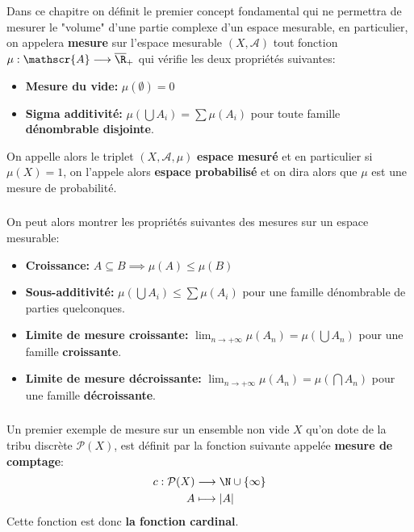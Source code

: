 \chapter*{} %

Dans ce chapitre on définit le premier concept fondamental qui ne permettra de mesurer le "volume" d'une partie complexe d'un espace mesurable, en particulier, on appelera \textbf{mesure} sur l'espace mesurable \((X, \mathscr{A})\) tout fonction \(\mu : \mathscr{A} \longrightarrow \overline{\R}_+\) qui vérifie les deux propriétés suivantes:
\begin{itemize}
   \item \textbf{Mesure du vide:} \(\mu(\emptyset) = 0\)
   \item \textbf{Sigma additivité:} \(\mu\left(\bigcup A_i\right) = \sum \mu\left(A_i\right)\) pour toute famille \textbf{dénombrable disjointe}. 
\end{itemize}
On appelle alors le triplet \((X, \mathscr{A}, \mu)\) \textbf{espace mesuré} et en particulier si \(\mu(X) = 1\), on l'appele alors \textbf{espace probabilisé} et on dira alors que \(\mu\) est une mesure de probabilité.
\subsection*{}
On peut alors montrer les propriétés suivantes des mesures sur un espace mesurable:
\begin{itemize}
   \item \textbf{Croissance:} \(A \subseteq B \implies \mu(A) \leq \mu(B)\)
   \item \textbf{Sous-additivité:} \(\mu\left(\bigcup A_i\right)\leq \sum \mu\left(A_i\right)\) pour une famille dénombrable de parties quelconques.
   \item \textbf{Limite de mesure croissante:} \(\lim_{n \rightarrow +\infty} \mu(A_n) = \mu\left(\bigcup A_n\right)\) pour une famille \textbf{croissante}.
   \item \textbf{Limite de mesure décroissante:} \(\lim_{n \rightarrow +\infty} \mu(A_n) = \mu\left(\bigcap A_n\right)\) pour une famille \textbf{décroissante}.
\end{itemize}

\subsection*{}
Un premier exemple de mesure sur un ensemble non vide \(X\) qu'on dote de la tribu discrète \(\mathcal{P}(X)\), est définit par la fonction suivante appelée \textbf{mesure de comptage}:
\[
   \begin{aligned}
      c : \mathcal{P}(X) &\longrightarrow \N \cup \{\infty\}\\
      A &\longmapsto |A|
   \end{aligned}
\]
Cette fonction est donc \textbf{la fonction cardinal}.
